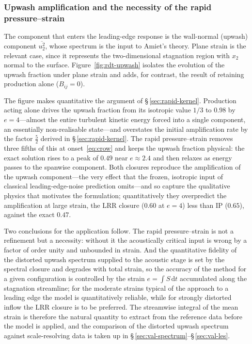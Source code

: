 \documentclass[lineno]{JFM-FLM_Au}
\begin{document}
\subsubsection{Upwash amplification and the necessity of the rapid
pressure--strain}\label{sec:upwash-verif}

The component that enters the leading-edge response is the wall-normal
(upwash) component $\overline{u_2^2}$, whose spectrum is the input to
Amiet's theory. Plane strain is the relevant case, since it represents the
two-dimensional stagnation region with $x_2$ normal to the surface.
Figure~\ref{fig:rdt-upwash} isolates the evolution of the upwash fraction
under plane strain and adds, for contrast, the result of retaining
production alone ($B_{ij}=0$).

The figure makes quantitative the argument of \S\,\ref{sec:rapid-kernel}.
Production acting alone drives the upwash fraction from its isotropic value
$1/3$ to $0.98$ by $e=4$---almost the entire turbulent kinetic energy
forced into a single component, an essentially non-realisable state---and
overstates the initial amplification rate by the factor $\tfrac52$ derived
in \S\,\ref{sec:rapid-kernel}. The rapid pressure--strain removes three
fifths of this at onset~\eqref{eq:crow} and keeps the upwash fraction
physical: the exact solution rises to a peak of $0.49$ near $e\approx2.4$
and then relaxes as energy passes to the spanwise component. Both closures
reproduce the amplification of the upwash component---the very effect that
the frozen, isotropic input of classical leading-edge-noise prediction
omits---and so capture the qualitative physics that motivates the
formulation; quantitatively they overpredict the amplification at large
strain, the LRR closure ($0.60$ at $e=4$) less than IP ($0.65$), against
the exact $0.47$.

Two conclusions for the application follow. The rapid pressure--strain is
not a refinement but a necessity: without it the acoustically critical
input is wrong by a factor of order unity and unbounded in strain. And the
quantitative fidelity of the distorted upwash spectrum supplied to the
acoustic stage is set by the spectral closure and degrades with total
strain, so the accuracy of the method for a given configuration is
controlled by the strain $e=\int S\,\mathrm{d}t$ accumulated along the
stagnation streamline; for the moderate strains typical of the approach to
a leading edge the model is quantitatively reliable, while for strongly
distorted inflow the LRR closure is to be preferred. The streamwise
integral of the mean strain is therefore the natural quantity to extract
from the reference data before the model is applied, and the comparison of
the distorted upwash spectrum against scale-resolving data is taken up in
\S\,\ref{sec:val-spectrum}--\S\,\ref{sec:val-les}.
\end{document}
